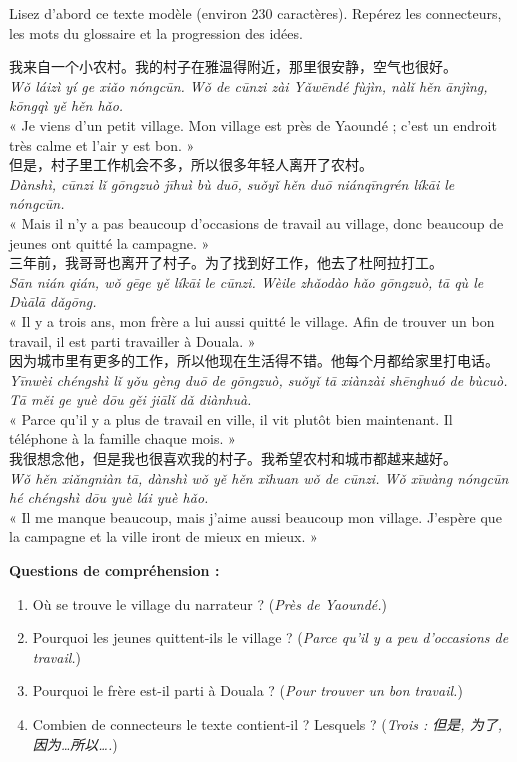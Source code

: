 \documentclass[11pt]{article}
\newcounter{popsec}
\newcounter{popsub}
\newcommand{\courssub}[1]{%
  \stepcounter{popsub}%
  \par\vspace{9pt}\noindent{\popxbold\fontsize{11.5}{13}\selectfont\color{popink}{\color{poporange}\thepopsec.\thepopsub}\hspace{6pt}#1}\par\nopagebreak\vspace{4pt}
}
\begin{document}
\courssub{Un texte modèle complet}

Lisez d'abord ce texte modèle (environ 230 caractères). Repérez les connecteurs, les mots du glossaire et la progression des idées.

\begin{textebox}
我来自一个小农村。我的村子在雅温得附近，那里很安静，空气也很好。\\
\emph{Wǒ láizì yí ge xiǎo nóngcūn. Wǒ de cūnzi zài Yǎwēndé fùjìn, nàlǐ hěn ānjìng, kōngqì yě hěn hǎo.}\\
« Je viens d'un petit village. Mon village est près de Yaoundé ; c'est un endroit très calme et l'air y est bon. »\\[4pt]
但是，村子里工作机会不多，所以很多年轻人离开了农村。\\
\emph{Dànshì, cūnzi lǐ gōngzuò jīhuì bù duō, suǒyǐ hěn duō niánqīngrén líkāi le nóngcūn.}\\
« Mais il n'y a pas beaucoup d'occasions de travail au village, donc beaucoup de jeunes ont quitté la campagne. »\\[4pt]
三年前，我哥哥也离开了村子。为了找到好工作，他去了杜阿拉打工。\\
\emph{Sān nián qián, wǒ gēge yě líkāi le cūnzi. Wèile zhǎodào hǎo gōngzuò, tā qù le Dùālā dǎgōng.}\\
« Il y a trois ans, mon frère a lui aussi quitté le village. Afin de trouver un bon travail, il est parti travailler à Douala. »\\[4pt]
因为城市里有更多的工作，所以他现在生活得不错。他每个月都给家里打电话。\\
\emph{Yīnwèi chéngshì lǐ yǒu gèng duō de gōngzuò, suǒyǐ tā xiànzài shēnghuó de bùcuò. Tā měi ge yuè dōu gěi jiālǐ dǎ diànhuà.}\\
« Parce qu'il y a plus de travail en ville, il vit plutôt bien maintenant. Il téléphone à la famille chaque mois. »\\[4pt]
我很想念他，但是我也很喜欢我的村子。我希望农村和城市都越来越好。\\
\emph{Wǒ hěn xiǎngniàn tā, dànshì wǒ yě hěn xǐhuan wǒ de cūnzi. Wǒ xīwàng nóngcūn hé chéngshì dōu yuè lái yuè hǎo.}\\
« Il me manque beaucoup, mais j'aime aussi beaucoup mon village. J'espère que la campagne et la ville iront de mieux en mieux. »
\end{textebox}

\textbf{Questions de compréhension :}
\begin{enumerate}
\item Où se trouve le village du narrateur ? (\emph{Près de Yaoundé.})
\item Pourquoi les jeunes quittent-ils le village ? (\emph{Parce qu'il y a peu d'occasions de travail.})
\item Pourquoi le frère est-il parti à Douala ? (\emph{Pour trouver un bon travail.})
\item Combien de connecteurs le texte contient-il ? Lesquels ? (\emph{Trois : 但是, 为了, 因为…所以….})
\end{enumerate}
\end{document}
